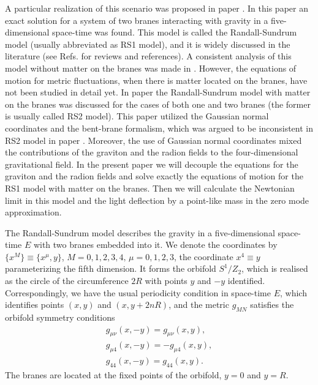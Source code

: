 \documentclass[a4paper,12pt]{article}
\begin{document}
A particular realization of this scenario was proposed in paper \cite{RS1}.
In this paper an exact solution for a system of two branes interacting with
gravity in a five-dimensional space-time was found. This model is called
the Randall-Sundrum model (usually abbreviated as RS1 model), and it is
widely discussed in the literature (see Refs. \cite{Rub01,Ant01} for
reviews and references). A consistent analysis of this model without matter
on the branes was made in \cite{BKSV}.  However, the equations of motion
for metric fluctuations, when there is matter located on the branes, have
not been studied in detail yet. In paper \cite{GarTan} the Randall-Sundrum
model with matter on the branes was discussed for the cases of both one and
two branes (the former is usually called RS2 model). This paper utilized
the Gaussian normal coordinates and the bent-brane formalism, which was
argued to be inconsistent in RS2 model in paper \cite{AIMVV}. Moreover, the
use of Gaussian normal coordinates mixed the contributions of the graviton
and the radion fields to the four-dimensional gravitational field. In the
present paper we will decouple the equations for the graviton and the
radion fields and solve exactly the equations of motion for the RS1 model
with matter on the branes. Then we will calculate the Newtonian limit in
this model and the light deflection by a point-like mass in the zero mode
approximation.

The Randall-Sundrum model \cite{RS1} describes the gravity in a
five-dimensional space-time $E$ with two branes embedded into it. We
denote the coordinates by $ \{ x^M\} \equiv \{x^{\mu},y\}$,
$M= 0,1,2,3,4, \, \mu=0,1,2,3$, the coordinate $x^4 \equiv y$  parameterizing
the fifth dimension. It forms the orbifold $S^{1}/Z_{2}$, which is
realised as the circle of the circumference $2R$ with points $y$
and $-y$ identified. Correspondingly, we have the usual periodicity
condition in space-time $E$, which identifies points $(x, y)$ and
$(x, y + 2nR)$, and
the metric $g_{MN}$ satisfies the orbifold symmetry conditions
\begin{eqnarray}
\label{orbifoldsym}
 g_{\mu \nu}(x,- y)=  g_{\mu \nu}(x,  y), \\
 \nonumber
  g_{\mu 4}(x,- y)= - g_{\mu 4}(x,  y), \\ \nonumber
   g_{44}(x,- y)=  g_{44}(x,  y).
\end{eqnarray}
The branes are located at the fixed points of the orbifold, $y=0$
and $y=R$.
\end{document}
